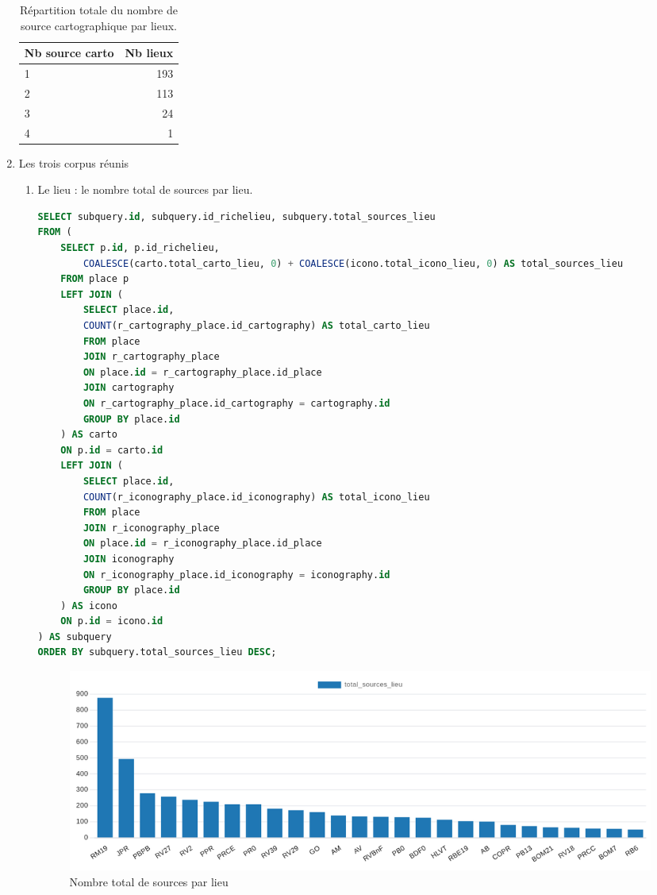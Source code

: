 \begin{enumerate}
\begin{table}[h!]
\centering
\begin{tabular}{|l|r|}
\toprule
\textbf{Nb source carto} & \textbf{Nb lieux} \\
\midrule
1 & 193 \\
2 & 113 \\
3 & 24 \\
4 & 1 \\
\bottomrule
\end{tabular}
\label{tab:repartition_lieu_carto}
\caption{Répartition totale du nombre de source cartographique par lieux.}
\end{table}

\newpage

    \item Les trois corpus réunis
    \begin{enumerate}
        \item Le lieu : le nombre total de sources par lieu. 
            \begin{lstlisting}[language=SQL, caption=Nombre total de ressources documentaires par lieu]
SELECT subquery.id, subquery.id_richelieu, subquery.total_sources_lieu
FROM (
    SELECT p.id, p.id_richelieu,  
        COALESCE(carto.total_carto_lieu, 0) + COALESCE(icono.total_icono_lieu, 0) AS total_sources_lieu
    FROM place p
    LEFT JOIN (
        SELECT place.id, 
        COUNT(r_cartography_place.id_cartography) AS total_carto_lieu 
        FROM place 
        JOIN r_cartography_place 
        ON place.id = r_cartography_place.id_place 
        JOIN cartography  
    	ON r_cartography_place.id_cartography = cartography.id 
        GROUP BY place.id
    ) AS carto 
    ON p.id = carto.id
    LEFT JOIN (
        SELECT place.id, 
        COUNT(r_iconography_place.id_iconography) AS total_icono_lieu 
        FROM place 
        JOIN r_iconography_place 
        ON place.id = r_iconography_place.id_place 
        JOIN iconography  
        ON r_iconography_place.id_iconography = iconography.id 
        GROUP BY place.id
    ) AS icono 
    ON p.id = icono.id
) AS subquery
ORDER BY subquery.total_sources_lieu DESC;\end{lstlisting}

\begin{figure}[ht!]
    \centering
    \includegraphics[width=1\linewidth]{images/graphiques/total_source_lieu.png}
    \caption{Nombre total de sources par lieu}
    \label{fig:total_source_lieu}
\end{figure}


\end{enumerate}
\end{enumerate}
